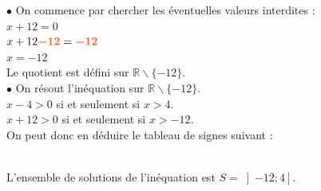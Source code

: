 \documentclass[a4paper,11pt]{article}
\begin{document}
\begin{seance}{}
\begin{enumerate}
$\bullet$ On commence par chercher les éventuelles valeurs interdites :\\$x +12 = 0$ \\$x +12 {\color[HTML]{f15929}\boldsymbol{-12}} = {\color[HTML]{f15929}\boldsymbol{-12}}$\\$x = -12$\\Le quotient est défini sur $\mathbb{R} \smallsetminus \{-12\}$.\\$\bullet$ On résout l'inéquation sur $\mathbb{R} \smallsetminus \{-12\}$.\\$x -4 > 0$ si et seulement si $x > 4$.\\$x+12 > 0$ si et seulement si $x > -12$.\\On peut donc en déduire le tableau de signes suivant :\\
\\ L'ensemble de solutions de l'inéquation est $S = \left] -12 ; 4 \right] $.


\end{enumerate}
\end{seance}
\end{document}
